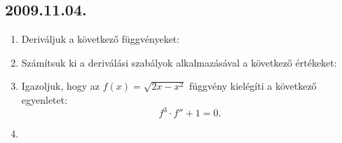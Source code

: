 \subsection*{2009.11.04.}
\begin{enumerate}
\item Deriváljuk a következő függvényeket:
\item Számítsuk ki a deriválási szabályok alkalmazásával a következő értékeket:
\item Igazoljuk, hogy az $f(x)=\sqrt{2x-x^2}$ függvény kielégíti a következő egyenletet: 
	\[f^3 \cdot f'' +1=0 .\]
\item
\end{enumerate}

